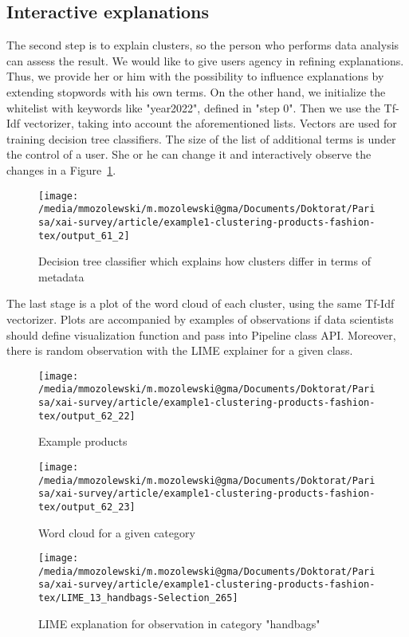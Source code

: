 \documentclass[
 twocolumn,
]{ceurart}
\begin{document}
\subsection{Interactive explanations}
The second step is to explain clusters, so the person who performs data analysis can assess the result.
We would like to give users agency in refining explanations.
Thus, we provide her or him with the possibility to influence explanations by extending stopwords with his own terms.
On the other hand, we initialize the whitelist with keywords like "year2022", defined in "step 0".
Then we use the Tf-Idf vectorizer, taking into account the aforementioned lists.
Vectors are used for training decision tree classifiers.
The size of the list of additional terms is under the control of a user.
She or he can change it and interactively observe the changes in a Figure~\ref{fig:decision_tree}.
\begin{figure}[h!]
  \centering
  \texttt{[image: /media/mmozolewski/m.mozolewski@gma/Documents/Doktorat/Parisa/xai-survey/article/example1-clustering-products-fashion-tex/output\_61\_2]}
  \caption{Decision tree classifier which explains how clusters differ in terms of metadata}
  \label{fig:decision_tree}
\end{figure}
The last stage is a plot of the word cloud of each cluster, using the same Tf-Idf vectorizer.
Plots are accompanied by examples of observations if data scientists should define visualization function and pass into Pipeline class API.
Moreover, there is random observation with the LIME explainer for a given class.
\begin{figure}[h!]
  \centering
  \texttt{[image: /media/mmozolewski/m.mozolewski@gma/Documents/Doktorat/Parisa/xai-survey/article/example1-clustering-products-fashion-tex/output\_62\_22]}
  \caption{Example products}
  \label{fig:example_products}
\end{figure}
\begin{figure}[h!]
  \centering
  \texttt{[image: /media/mmozolewski/m.mozolewski@gma/Documents/Doktorat/Parisa/xai-survey/article/example1-clustering-products-fashion-tex/output\_62\_23]}
  \caption{Word cloud for a given category}
  \label{fig:wordcloud}
\end{figure}
\begin{figure}[h!]
  \centering
  \texttt{[image: /media/mmozolewski/m.mozolewski@gma/Documents/Doktorat/Parisa/xai-survey/article/example1-clustering-products-fashion-tex/LIME\_13\_handbags-Selection\_265]}
  \caption{LIME explanation for observation in category "handbags"}
  \label{fig:lime}
\end{figure}
\end{document}
